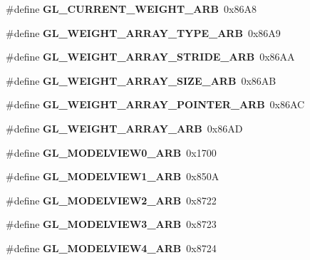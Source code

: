 \begin{DoxyCompactItemize}
\item 
\#define {\bfseries G\+L\+\_\+\+C\+U\+R\+R\+E\+N\+T\+\_\+\+W\+E\+I\+G\+H\+T\+\_\+\+A\+R\+B}~0x86\+A8\label{_s_d_l__opengl_8h_a5d4dbcc01865bfe5799a793886630797}

\item 
\#define {\bfseries G\+L\+\_\+\+W\+E\+I\+G\+H\+T\+\_\+\+A\+R\+R\+A\+Y\+\_\+\+T\+Y\+P\+E\+\_\+\+A\+R\+B}~0x86\+A9\label{_s_d_l__opengl_8h_a095021ade0aecbdaed5db861606fab70}

\item 
\#define {\bfseries G\+L\+\_\+\+W\+E\+I\+G\+H\+T\+\_\+\+A\+R\+R\+A\+Y\+\_\+\+S\+T\+R\+I\+D\+E\+\_\+\+A\+R\+B}~0x86\+A\+A\label{_s_d_l__opengl_8h_a444c6ee1e48470429cd91230d1e6bfb6}

\item 
\#define {\bfseries G\+L\+\_\+\+W\+E\+I\+G\+H\+T\+\_\+\+A\+R\+R\+A\+Y\+\_\+\+S\+I\+Z\+E\+\_\+\+A\+R\+B}~0x86\+A\+B\label{_s_d_l__opengl_8h_a92e50e574f3d23f717e86589f2c74771}

\item 
\#define {\bfseries G\+L\+\_\+\+W\+E\+I\+G\+H\+T\+\_\+\+A\+R\+R\+A\+Y\+\_\+\+P\+O\+I\+N\+T\+E\+R\+\_\+\+A\+R\+B}~0x86\+A\+C\label{_s_d_l__opengl_8h_aebc4e6ec752a7f80a1247aad2ba4c932}

\item 
\#define {\bfseries G\+L\+\_\+\+W\+E\+I\+G\+H\+T\+\_\+\+A\+R\+R\+A\+Y\+\_\+\+A\+R\+B}~0x86\+A\+D\label{_s_d_l__opengl_8h_a3689b10d11e254159d28b9b516f461f4}

\item 
\#define {\bfseries G\+L\+\_\+\+M\+O\+D\+E\+L\+V\+I\+E\+W0\+\_\+\+A\+R\+B}~0x1700\label{_s_d_l__opengl_8h_aeb39b3752a59fa1f51df89b024110926}

\item 
\#define {\bfseries G\+L\+\_\+\+M\+O\+D\+E\+L\+V\+I\+E\+W1\+\_\+\+A\+R\+B}~0x850\+A\label{_s_d_l__opengl_8h_a6ee7f305f7045428538999639d4f5547}

\item 
\#define {\bfseries G\+L\+\_\+\+M\+O\+D\+E\+L\+V\+I\+E\+W2\+\_\+\+A\+R\+B}~0x8722\label{_s_d_l__opengl_8h_a8dc08b37e90f3123ea27e6dbf5e01ac7}

\item 
\#define {\bfseries G\+L\+\_\+\+M\+O\+D\+E\+L\+V\+I\+E\+W3\+\_\+\+A\+R\+B}~0x8723\label{_s_d_l__opengl_8h_a8bad9653084a1f64c44609664868a527}

\item 
\#define {\bfseries G\+L\+\_\+\+M\+O\+D\+E\+L\+V\+I\+E\+W4\+\_\+\+A\+R\+B}~0x8724\label{_s_d_l__opengl_8h_a83fc3a493f188752436bbd0a0d74296c}


\end{DoxyCompactItemize}
